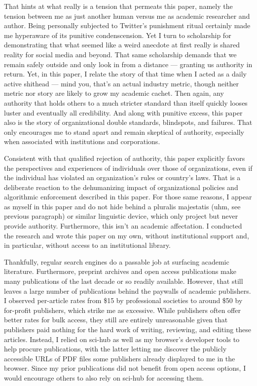 That hints at what really is a tension that permeats this paper, namely the
tension between me as just another human versus me as academic researcher and
author. Being personally subjected to Twitter's punishment ritual certainly made
me hyperaware of its punitive condenscension. Yet I turn to scholarship for
demonstrating that what seemed like a weird anecdote at first really is shared
reality for social media and beyond. That same scholarship demands that we
remain safely outside and only look in from a distance --- granting us authority
in return. Yet, in this paper, I relate the story of that time when I acted as a
daily active shithead --- mind you, that's an actual industry metric, though
neither metric nor story are likely to grow my academic cachet. Then again, any
authority that holds others to a much stricter standard than itself quickly
looses luster and eventually all credibility. And along with punitive excess,
this paper also is the story of organizational double standards, blindspots, and
failures. That only encourages me to stand apart and remain skeptical of
authority, especially when associated with institutions and corporations.

Consistent with that qualified rejection of authority, this paper explicitly
favors the perspectives and experiences of individuals over those of
organizations, even if the individual has violated an organization's rules or
country's laws. That is a deliberate reaction to the dehumanizing impact of
organizational policies and algorithmic enforcement described in this paper. For
those same reasons, I appear as myself in this paper and do not hide behind a
pluralis majestatis (uhm, see previous paragraph) or similar linguistic device,
which only project but never provide authority. Furthermore, this isn't an
academic affectation. I conducted the research and wrote this paper on my own,
without institutional support and, in particular, without access to an
institutional library.

Thankfully, regular search engines do a passable job at surfacing academic
literature. Furthermore, preprint archives and open access publications make
many publications of the last decade or so readily available. However, that
still leaves a large number of publications behind the paywalls of academic
publishers. I observed per-article rates from \$15 by professional societies to
around \$50 by for-profit publishers, which strike me as excessive. While
publishers often offer better rates for bulk access, they still are entirely
unreasonable given that publishers paid nothing for the hard work of writing,
reviewing, and editing these articles. Instead, I relied on sci-hub as well as
my browser's developer tools to help procure publications, with the latter
letting me discover the publicly accessible URLs of PDF files some publishers
already displayed to me in the browser. Since my prior publications did not
benefit from open access options, I would encourage others to also rely on
sci-hub for accessing them.

